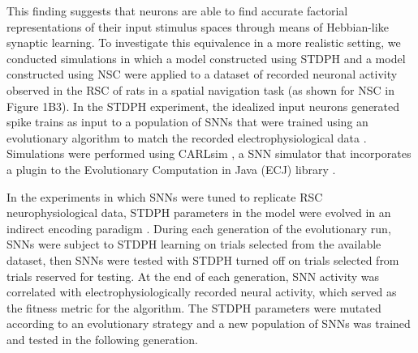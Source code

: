 This finding suggests that neurons are able to find accurate factorial
representations of their input stimulus spaces through means of Hebbian-like
synaptic learning. 
To investigate this equivalence
in a more realistic setting,
we conducted simulations in which a model constructed using \ac{STDPH}
and a model constructed using \ac{NSC}
were applied to a dataset of recorded neuronal activity 
observed in the \ac{RSC} of rats in a  spatial navigation task 
(as shown for \ac{NSC} in Figure 1B3). 
In the \ac{STDPH} experiment, the idealized input neurons generated spike trains as input to a population of \acp{SNN} that were trained using an evolutionary algorithm
to match the recorded electrophysiological data \cite{Rounds2016}.
Simulations were performed using CARLsim \cite{BeyelerCarlsonChou2015}, a \ac{SNN} simulator that incorporates a plugin \cite{Carlson2014} to the Evolutionary Computation in Java (ECJ) library \cite{white2012}.


In the experiments in which \acp{SNN} were tuned to replicate \ac{RSC} neurophysiological data, \ac{STDPH} parameters in the model were evolved in an indirect encoding paradigm \cite{Rounds2016}. During each generation of the evolutionary run, \acp{SNN} were subject to \ac{STDPH} learning on trials selected from the available dataset, then \acp{SNN} were tested with \ac{STDPH} turned off on trials selected from trials reserved for testing. At the end of each generation, \ac{SNN} activity 
was correlated with electrophysiologically recorded neural activity, which served as the fitness metric for the algorithm. The \ac{STDPH} parameters were mutated according to an evolutionary strategy and a new population of \acp{SNN} was trained and tested in the following generation.


